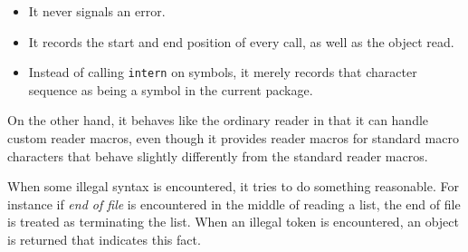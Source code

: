 \begin{itemize}
\item It never signals an error.
\item It records the start and end position of every call, as well as
  the object read.
\item Instead of calling \texttt{intern} on symbols, it merely records
  that character sequence as being a symbol in the current package. 
\end{itemize}

On the other hand, it behaves like the ordinary \commonlisp{} reader
in that it can handle custom reader macros, even though it provides
reader macros for standard macro characters that behave slightly
differently from the standard reader macros.

When some illegal syntax is encountered, it tries to do something
reasonable.  For instance if \emph{end of file} is encountered in the
middle of reading a list, the end of file is treated as terminating
the list.  When an illegal token is encountered, an object is returned
that indicates this fact. 


